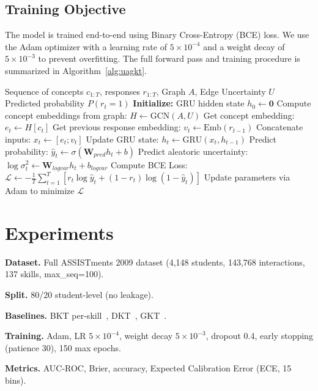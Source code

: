 \documentclass[11pt]{article}
\begin{document}
\subsection{Training Objective}
The model is trained end-to-end using Binary Cross-Entropy (BCE) loss. We use the Adam optimizer with a learning rate of $5 \times 10^{-4}$ and a weight decay of $5 \times 10^{-3}$ to prevent overfitting. The full forward pass and training procedure is summarized in Algorithm~\ref{alg:uagkt}.

\begin{algorithm}[h]
\caption{UAG-KT Forward Pass and Training}
\label{alg:uagkt}
\begin{algorithmic}[1]
\REQUIRE Sequence of concepts \(c_{1:T}\), responses \(r_{1:T}\), Graph \(A\), Edge Uncertainty \(U\)
\ENSURE Predicted probability \(P(r_t=1)\)
\STATE \textbf{Initialize:} GRU hidden state \(h_0 \gets \mathbf{0}\)
\STATE Compute concept embeddings from graph: \(H \gets \mathrm{GCN}(A, U)\)
    \STATE Get concept embedding: \(e_t \gets H[c_t]\)
    \STATE Get previous response embedding: \(v_t \gets \mathrm{Emb}(r_{t-1})\)
    \STATE Concatenate inputs: \(x_t \gets [e_t ; v_t]\)
    \STATE Update GRU state: \(h_t \gets \mathrm{GRU}(x_t, h_{t-1})\)
    \STATE Predict probability: \(\hat{y}_t \gets \sigma(\mathbf{W}_{pred} h_t + b)\)
    \STATE Predict aleatoric uncertainty: \(\log \sigma^2_t \gets \mathbf{W}_{logvar} h_t + b_{logvar}\)
\ENDFOR
\STATE Compute BCE Loss: \(\mathcal{L} \gets -\frac{1}{T} \sum_{t=1}^T [r_t \log \hat{y}_t + (1-r_t) \log(1-\hat{y}_t)]\)
\STATE Update parameters via Adam to minimize \(\mathcal{L}\)
\end{algorithmic}
\end{algorithm}

\section{Experiments}
\textbf{Dataset.} Full ASSISTments 2009 dataset (4,148 students, 143,768 interactions, 137 skills, max\_seq=100).

\textbf{Split.} 80/20 student-level (no leakage).

\textbf{Baselines.} BKT per-skill~\cite{corbett1994}, DKT~\cite{piech2015}, GKT~\cite{nakagawa2019}.

\textbf{Training.} Adam, LR $5\times10^{-4}$, weight decay $5\times10^{-3}$, dropout 0.4, early stopping (patience 30), 150 max epochs.

\textbf{Metrics.} AUC-ROC, Brier, accuracy, Expected Calibration Error (ECE, 15 bins).
\end{document}
